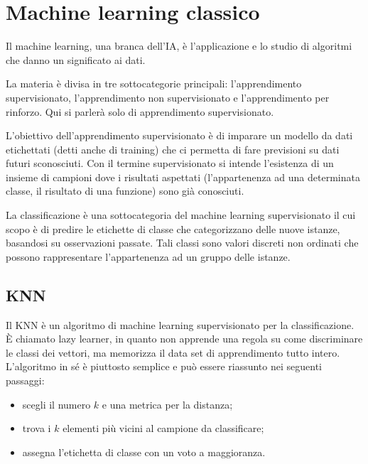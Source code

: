 \section{Machine learning classico} \label{sec:machine_learning}


\begin{definition}
    Il machine learning, una branca dell'\ac{IA}, è l'applicazione e lo studio  
    di algoritmi che danno un significato ai dati. 
\end{definition}

La materia è divisa in tre sottocategorie principali: 
l'apprendimento supervisionato, l'apprendimento non supervisionato e l'apprendimento per rinforzo. 
Qui si parlerà solo di apprendimento supervisionato. 

L'obiettivo dell'apprendimento supervisionato è di imparare un modello da dati 
etichettati (detti anche di training) che ci permetta di fare previsioni su dati futuri sconosciuti. 
Con il termine supervisionato si intende l'esistenza di un insieme di campioni 
dove i risultati aspettati (l'appartenenza ad una determinata classe, il 
risultato di una funzione) sono già conosciuti. 

La classificazione
è una sottocategoria del machine learning supervisionato il cui 
scopo è di predire le etichette di classe che categorizzano delle nuove istanze, 
basandosi su osservazioni passate. Tali classi sono valori discreti non ordinati 
che possono rappresentare l'appartenenza ad un gruppo delle istanze. 

\subsection{KNN} \label{sec:knn}

Il \acf{KNN} è un algoritmo di machine learning supervisionato per la classificazione. 
È chiamato lazy learner, in quanto non apprende una regola su come discriminare 
le classi dei vettori, ma memorizza il data set di apprendimento tutto intero. 
L'algoritmo in sé è piuttosto semplice e può essere riassunto nei seguenti passaggi: 
\begin{itemize}
    \item scegli il numero $k$ e una metrica per la distanza; 
    \item trova i $k$ elementi più vicini al campione da classificare; 
    \item assegna l'etichetta di classe con un voto a maggioranza. 
\end{itemize}

